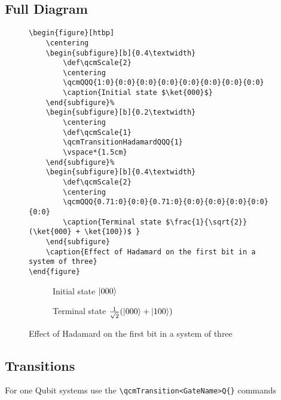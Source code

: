 \documentclass{article}
\begin{document}
\subsection*{Full Diagram}
\begin{figure}[htbp]
    \begin{verbatim}
\begin{figure}[htbp]
    \centering
    \begin{subfigure}[b]{0.4\textwidth}
        \def\qcmScale{2}
        \centering
        \qcmQQQ{1:0}{0:0}{0:0}{0:0}{0:0}{0:0}{0:0}{0:0}
        \caption{Initial state $\ket{000}$}
    \end{subfigure}%
    \begin{subfigure}[b]{0.2\textwidth}
        \centering
        \def\qcmScale{1}
        \qcmTransitionHadamardQQQ{1}
        \vspace*{1.5cm}
    \end{subfigure}%
    \begin{subfigure}[b]{0.4\textwidth}
        \def\qcmScale{2}
        \centering
        \qcmQQQ{0.71:0}{0:0}{0.71:0}{0:0}{0:0}{0:0}{0:0}{0:0}
        \caption{Terminal state $\frac{1}{\sqrt{2}}(\ket{000} + \ket{100})$ }
    \end{subfigure}
    \caption{Effect of Hadamard on the first bit in a system of three}
\end{figure}
    \end{verbatim}
    \centering
    \begin{subfigure}[b]{0.4\textwidth}
        \def\qcmScale{2}
        \centering
        \caption{Initial state $\ket{000}$}
    \end{subfigure}%
    \begin{subfigure}[b]{0.2\textwidth}
        \centering
        \def\qcmScale{1}
        \vspace*{1.5cm}
    \end{subfigure}%
    \begin{subfigure}[b]{0.4\textwidth}
        \def\qcmScale{2}
        \centering
        \caption{Terminal state $\frac{1}{\sqrt{2}}(\ket{000} + \ket{100})$ }
    \end{subfigure}
    \caption{Effect of Hadamard on the first bit in a system of three}
\end{figure}

\subsection*{Transitions}
For one Qubit systems use the \verb|\qcmTransition<GateName>Q{}| commands
\end{document}
